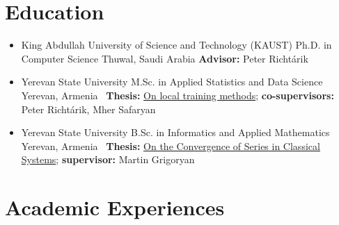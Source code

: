 \documentclass[10pt,a4paper,sans]{moderncv}        %
\newcommand{\peter}{Peter Richtárik}
\newcommand{\mher}{Mher Safaryan}
\newcommand{\grigoryan}{Martin Grigoryan}
\begin{document}
\makecvtitle 



\section{Education}

\begin{itemize}

\item{
  {King Abdullah University of Science and Technology (KAUST)}
  {Ph.D. in Computer Science}
  {Thuwal, Saudi Arabia}{}
  {\textbf{Advisor:} \peter}
} 

\vspace{1mm}

\item{
  {Yerevan State University}
  {M.Sc. in Applied Statistics and Data Science}
  {Yerevan, Armenia}{}
  {\faFile \ \textbf{Thesis:} \href{https://artomaranjyan.github.io/assets/pdf/Master_thesis.pdf}{On local training methods}; \textbf{co-supervisors:} \peter, \mher }
}

\vspace{1mm}

\item{
  {Yerevan State University}
  {B.Sc. in Informatics and Applied Mathematics}
  {Yerevan, Armenia}{}
  {\faFile \ \textbf{Thesis:} \href{https://artomaranjyan.github.io/assets/pdf/Bachelor_thesis.pdf}{On the Convergence of Series in Classical Systems}; \textbf{supervisor:} \grigoryan\\ }
}

\end{itemize}


\section{Academic Experiences}
\end{document}
